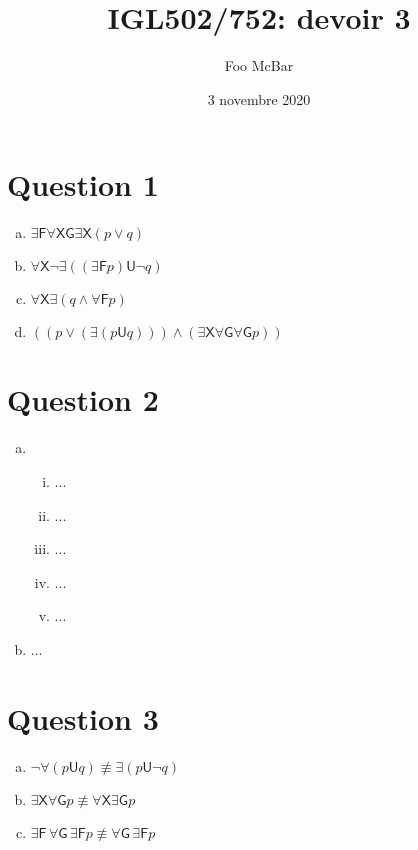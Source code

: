 \documentclass{article}
\title{IGL502/752: devoir 3}
\author{Foo McBar}
\date{3 novembre 2020}
\newcommand{\X}{{\mathsf{X}}}
\newcommand{\F}{{\mathsf{F}}}
\newcommand{\G}{{\mathsf{G}}}
\newcommand{\U}{\mathrel{\mathsf{U}}}
\begin{document}
\maketitle

\section*{Question 1}

\begin{multicols}{2}
  \begin{enumerate}[(a)]
    
  \item $\exists \F \forall \X \G \exists \X (p \lor q)$
    
  \item $\forall \X \neg \exists ((\exists \F p) \U \neg q)$
    
    
  \item $\forall \X \exists (q \land \forall \F p)$
    
  \item $((p \lor (\exists (p \U q))) \land (\exists \X \forall \G
    \forall \G p))$
  \end{enumerate}
\end{multicols}

\section*{Question 2}

\begin{enumerate}[(a)]

\item

  \begin{enumerate}[(i)]
  \item ...
  \item ...
  \item ...
  \item ...
  \item ...
  \end{enumerate}

\item ...

\end{enumerate}

\section*{Question 3}

\begin{enumerate}[(a)]
\item $\neg \forall (p \U q) \not\equiv \exists (p \U \neg q)$
  
\item $\exists \X \forall \G p \not\equiv \forall \X \exists \G p$
  
  
\item $\exists \F\, \forall \G\, \exists \F p \not\equiv \forall \G\,
  \exists \F p$

\end{enumerate}
\end{document}
